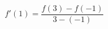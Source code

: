 \documentclass[preview]{standalone}
\begin{document}
\begin{align*}
f'(1) = \dfrac{f(3) - f(-1)}{3 - (-1)}
\end{align*}
\end{document}
